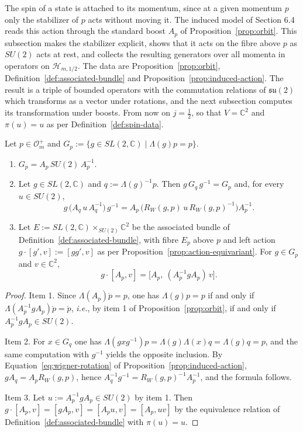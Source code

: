 The spin of a state is attached to its momentum, since at a given momentum $p$ only the stabilizer of $p$ acts without moving it. The induced model of Section 6.4 reads this action through the standard boost $A_p$ of Proposition~\ref{prop:orbit}. This subsection makes the stabilizer explicit, shows that it acts on the fibre above $p$ as $SU(2)$ acts at rest, and collects the resulting generators over all momenta in operators on $\mathcal{H}_{m,1/2}$. The data are Proposition~\ref{prop:orbit}, Definition~\ref{def:associated-bundle} and Proposition~\ref{prop:induced-action}. The result is a triple of bounded operators with the commutation relations of $\mathfrak{su}(2)$ which transforms as a vector under rotations, and the next subsection computes its transformation under boosts. From now on $j=\frac12$, so that $V=\mathbb{C}^2$ and $\pi(u)=u$ as per Definition~\ref{def:spin-data}.

\begin{lemma}\label{lem:stabilizer}
	Let $p\in\mathcal{O}_m^+$ and $G_p:=\{g\in SL(2,\mathbb{C})\mid\Lambda(g)p=p\}$.
	\begin{enumerate}
		\item $G_p=A_p\,SU(2)\,A_p^{-1}$.
		\item Let $g\in SL(2,\mathbb{C})$ and $q:=\Lambda(g)^{-1}p$. Then $g\,G_q\,g^{-1}=G_p$ and, for every $u\in SU(2)$,
		\begin{equation*}
			g\,\big(A_q\,u\,A_q^{-1}\big)\,g^{-1}=A_p\,\big(R_W(g,p)\,u\,R_W(g,p)^{-1}\big)A_p^{-1}.
		\end{equation*}
		\item Let $E:=SL(2,\mathbb{C})\times_{SU(2)}\mathbb{C}^2$ be the associated bundle of Definition~\ref{def:associated-bundle}, with fibre $E_p$ above $p$ and left action $g\cdot[g',v]:=[gg',v]$ as per Proposition~\ref{prop:action-equivariant}. For $g\in G_p$ and $v\in\mathbb{C}^2$,
		\begin{equation*}
			g\cdot[A_p,v]=\big[A_p,\ (A_p^{-1}gA_p)\,v\big].
		\end{equation*}
	\end{enumerate}
\end{lemma}

\begin{proof}
	Item 1. Since $\Lambda(A_p)\mathring{p}=p$, one has $\Lambda(g)p=p$ if and only if $\Lambda(A_p^{-1}gA_p)\mathring{p}=\mathring{p}$, \textit{i.e.}, by item 1 of Proposition~\ref{prop:orbit}, if and only if $A_p^{-1}gA_p\in SU(2)$.
	
	Item 2. For $x\in G_q$ one has $\Lambda(gxg^{-1})p=\Lambda(g)\Lambda(x)q=\Lambda(g)q=p$, and the same computation with $g^{-1}$ yields the opposite inclusion. By Equation~\eqref{eq:wigner-rotation} of Proposition~\ref{prop:induced-action}, $gA_q=A_pR_W(g,p)$, hence $A_q^{-1}g^{-1}=R_W(g,p)^{-1}A_p^{-1}$, and the formula follows.
	
	Item 3. Let $u:=A_p^{-1}gA_p\in SU(2)$ by item 1. Then $g\cdot[A_p,v]=[gA_p,v]=[A_pu,v]=[A_p,uv]$ by the equivalence relation of Definition~\ref{def:associated-bundle} with $\pi(u)=u$.
\end{proof}

